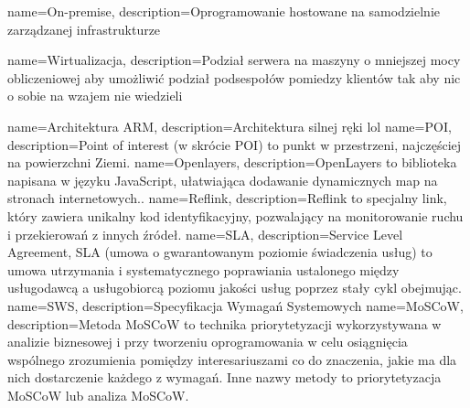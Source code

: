 {
    name={On-premise},
    description={Oprogramowanie hostowane na samodzielnie zarządzanej infrastrukturze}
}

{
    name={Wirtualizacja},
    description={Podział serwera na maszyny o mniejszej mocy obliczeniowej aby umożliwić podział podsespołów pomiedzy klientów tak aby nic o sobie na wzajem nie wiedzieli}
}

{
    name={Architektura ARM},
    description={Architektura silnej ręki lol}
}
{
    name={POI},
    description={Point of interest (w skrócie POI) to punkt w przestrzeni, najczęściej na powierzchni Ziemi.}
}
{
    name={Openlayers},
    description={OpenLayers to biblioteka napisana w języku JavaScript, ułatwiająca dodawanie dynamicznych map na stronach internetowych..}
}
{
    name={Reflink},
    description={Reflink to specjalny link, który zawiera unikalny kod identyfikacyjny, pozwalający na monitorowanie ruchu i przekierowań z innych źródeł.}
}
{
    name={SLA},
    description={Service Level Agreement, SLA (umowa o gwarantowanym poziomie świadczenia usług) to umowa utrzymania i systematycznego poprawiania ustalonego między usługodawcą a usługobiorcą poziomu jakości usług poprzez stały cykl obejmując.}
}
{
    name={SWS},
    description={Specyfikacja Wymagań Systemowych }
}
{
    name={MoSCoW},
    description={Metoda MoSCoW to technika priorytetyzacji wykorzystywana w analizie biznesowej i przy tworzeniu oprogramowania w celu osiągnięcia wspólnego zrozumienia pomiędzy interesariuszami co do znaczenia, jakie ma dla nich dostarczenie każdego z wymagań. Inne nazwy metody to priorytetyzacja MoSCoW lub analiza MoSCoW.}
}